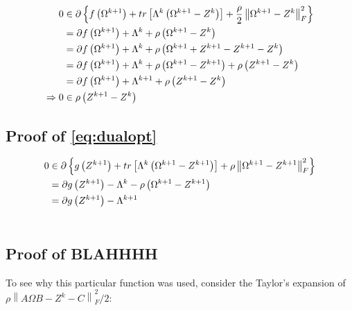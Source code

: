 \documentclass[11pt,]{report}
\begin{document}
\begin{equation}
\begin{split}
  0 &\in \partial \left\{ f\left(\Omega^{k + 1}\right) + tr\left[ \Lambda^{k}\left( \Omega^{k + 1} - Z^{k} \right) \right] + \frac{\rho}{2}\left\| \Omega^{k + 1} - Z^{k} \right\|_{F}^{2} \right\} \\
  &= \partial f\left(\Omega^{k + 1}\right) + \Lambda^{k} + \rho\left(\Omega^{k + 1} - Z^{k}\right) \\
  &= \partial f\left(\Omega^{k + 1}\right) + \Lambda^{k} + \rho\left(\Omega^{k + 1} + Z^{k + 1} - Z^{k + 1} - Z^{k}\right) \\
  &= \partial f\left(\Omega^{k + 1}\right) + \Lambda^{k} + \rho\left(\Omega^{k + 1} - Z^{k + 1}\right) + \rho\left(Z^{k + 1} - Z^{k}\right) \\
  &= \partial f\left(\Omega^{k + 1}\right) + \Lambda^{k + 1} + \rho\left(Z^{k + 1} - Z^{k}\right) \\
  \Rightarrow 0 &\in \rho\left( Z^{k + 1} - Z^{k} \right)
\label{eq:appendixdualresidual}\notag
\end{split}
\end{equation}

\hypertarget{proofdualopt}{%
\subsection{Proof of \eqref{eq:dualopt}}\label{proofdualopt}}

\begin{equation}
\begin{split}
  0 &\in \partial \left\{ g\left(Z^{k + 1}\right) + tr\left[ \Lambda^{k}\left( \Omega^{k + 1} - Z^{k + 1} \right) \right] + \rho\left\| \Omega^{k + 1} - Z^{k + 1} \right\|_{F}^{2} \right\} \\
  &= \partial g\left(Z^{k + 1}\right) - \Lambda^{k} - \rho\left(\Omega^{k + 1} - Z^{k + 1}\right) \\
  &= \partial g\left(Z^{k + 1}\right) - \Lambda^{k + 1} \\
\label{eq:appendixdualopt}\notag
\end{split}
\end{equation}

\hypertarget{proof-of-blahhhh}{%
\subsection{Proof of BLAHHHH}\label{proof-of-blahhhh}}

To see why this particular function was used, consider the Taylor's expansion of \(\rho\left\|A\Omega B - Z^{k} - C\right\|_{F}^{2}/2\):
\end{document}
